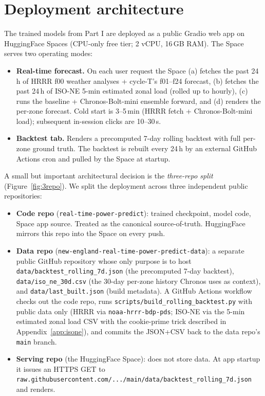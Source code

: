 
\section{Deployment architecture}
\label{sec:deploy:arch}

The trained models from Part I are deployed as a public Gradio web app on HuggingFace Spaces (CPU-only free tier; 2 vCPU, 16\,GB RAM). The Space serves two operating modes:

\begin{itemize}\setlength\itemsep{1pt}
  \item \textbf{Real-time forecast.} On each user request the Space (a) fetches the past 24\,h of HRRR f00 weather analyses + cycle-T's f01--f24 forecast, (b) fetches the past 24\,h of ISO-NE 5-min estimated zonal load (rolled up to hourly), (c) runs the baseline + Chronos-Bolt-mini ensemble forward, and (d) renders the per-zone forecast. Cold start is 3--5\,min (HRRR fetch + Chronos-Bolt-mini load); subsequent in-session clicks are 10--30\,s.
  \item \textbf{Backtest tab.} Renders a precomputed 7-day rolling backtest with full per-zone ground truth. The backtest is rebuilt every 24\,h by an external GitHub Actions cron and pulled by the Space at startup.
\end{itemize}

A small but important architectural decision is the \emph{three-repo split} (Figure~\ref{fig:3repo}). We split the deployment across three independent public repositories:

\begin{itemize}\setlength\itemsep{1pt}
  \item \textbf{Code repo} (\texttt{real-time-power-predict}): trained checkpoint, model code, Space app source. Treated as the canonical source-of-truth. HuggingFace mirrors this repo into the Space on every push.
  \item \textbf{Data repo} (\texttt{new-england-real-time-power-predict-data}): a separate public GitHub repository whose only purpose is to host \texttt{data/backtest\_rolling\_7d.json} (the precomputed 7-day backtest), \texttt{data/iso\_ne\_30d.csv} (the 30-day per-zone history Chronos uses as context), and \texttt{data/last\_built.json} (build metadata). A GitHub Actions workflow checks out the code repo, runs \texttt{scripts/build\_rolling\_backtest.py} with public data only (HRRR via \texttt{noaa-hrrr-bdp-pds}; ISO-NE via the 5-min estimated zonal load CSV with the cookie-prime trick described in Appendix~\ref{app:isone}), and commits the JSON+CSV back to the data repo's \texttt{main} branch.
  \item \textbf{Serving repo} (the HuggingFace Space): does not store data. At app startup it issues an HTTPS GET to \texttt{raw.githubusercontent.com/.../main/data/backtest\_rolling\_7d.json} and renders.
\end{itemize}

